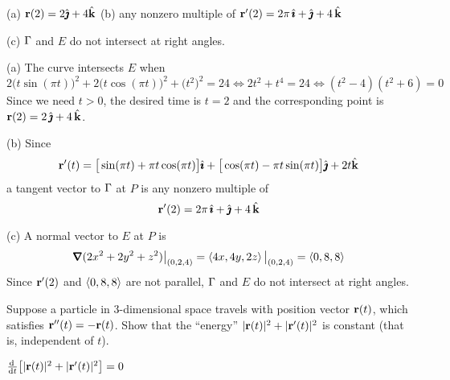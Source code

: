 
\begin{answer}
(a) $\mathbf{r}(2)=2\hat{\pmb{\jmath}}+4\hat{\mathbf{k}}$\qquad
(b) any nonzero multiple of $\mathbf{r}'(2)=2\pi\,\hat{\pmb{\imath}}+\hat{\pmb{\jmath}}+4\,\hat{\mathbf{k}}$

(c) $\Gamma$ and $E$ do not intersect at right angles.
\end{answer}

\begin{solution}
(a) The curve intersects $E$ when
\begin{equation*}
2\big(t\sin(\pi t)\big)^2+2\big(t\cos(\pi t)\big)^2 +\big(t^2\big)^2=24
\iff 2t^2+t^4=24
\iff (t^2-4)(t^2+6)=0
\end{equation*}
Since we need $t>0$, the desired time is $t=2$ and the corresponding point
is $\mathbf{r}(2)=2\,\hat{\pmb{\jmath}}+4\,\hat{\mathbf{k}}$.

(b) Since
\begin{equation*}
\mathbf{r}'(t)=\big[\sin(\pi t)+\pi t\cos(\pi t)\big]\hat{\pmb{\imath}}
    +\big[\cos(\pi t)-\pi t\sin(\pi t)\big]\hat{\pmb{\jmath}} + 2t\hat{\mathbf{k}}
\end{equation*}
a tangent vector to $\Gamma$ at $P$ is any nonzero multiple of
\begin{equation*}
\mathbf{r}'(2)=2\pi\,\hat{\pmb{\imath}}+\hat{\pmb{\jmath}}+4\,\hat{\mathbf{k}}
\end{equation*}

(c) A normal vector to $E$ at $P$ is
\begin{equation*}
\vnabla(2x^2+2y^2+z^2)\big|_{(0,2,4)}= \llt 4x,4y,2z\rgt\big|_{(0,2,4)}
=\llt 0,8,8\rgt
\end{equation*}
Since $\mathbf{r}'(2)$ and $\left< 0,8,8\right>$ are not parallel, $\Gamma$ and $E$
do not intersect at right angles.
\end{solution}

\begin{question} [M200 2001A] %
Suppose a particle in 3-dimensional space travels with
position vector $\mathbf{r}(t)$, which satisfies $\mathbf{r}''(t)=-\mathbf{r}(t)$. Show
that the ``energy'' $|\mathbf{r}(t)|^2+|\mathbf{r}'(t)|^2$ is constant (that is,
independent of $t$).
\end{question}

%

\begin{answer}
$\diff{}{t}\big[|\vr(t)|^2+|\vr'(t)|^2\big]=0$
\end{answer}

